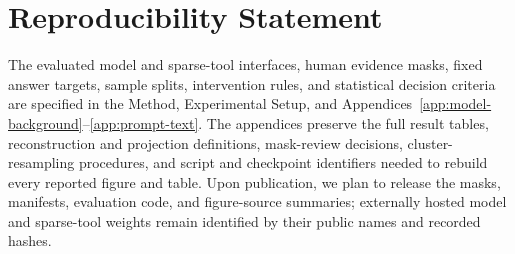 \section*{Reproducibility Statement}

The evaluated model and sparse-tool interfaces, human evidence masks, fixed answer targets, sample splits, intervention rules, and statistical decision criteria are specified in the Method, Experimental Setup, and Appendices~\ref{app:model-background}--\ref{app:prompt-text}. The appendices preserve the full result tables, reconstruction and projection definitions, mask-review decisions, cluster-resampling procedures, and script and checkpoint identifiers needed to rebuild every reported figure and table. Upon publication, we plan to release the masks, manifests, evaluation code, and figure-source summaries; externally hosted model and sparse-tool weights remain identified by their public names and recorded hashes.
